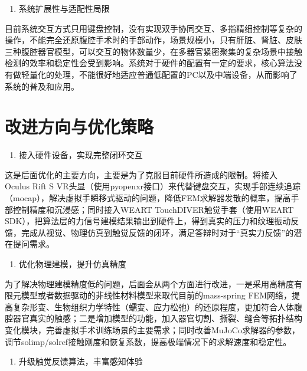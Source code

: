 \begin{enumerate}
\def\labelenumi{\arabic{enumi}.}
\setcounter{enumi}{3}
\item
  系统扩展性与适配性局限
\end{enumerate}

目前系统交互方式只用键盘控制，没有实现双手协同交互、多指精细控制等复杂的操作，不能完全还原腹腔手术时的手部动作，场景规模小，只有肝脏、肾脏、皮肤三种腹腔器官模型，可以交互的物体数量少，在多器官紧密聚集的复杂场景中接触检测的效率和稳定性会受到影响。系统对于硬件的配置有一定的要求，核心算法没有做轻量化的处理，不能很好地适应普通低配置的PC以及中端设备，从而影响了系统的普及和应用。

\section{改进方向与优化策略}

\begin{enumerate}
\def\labelenumi{\arabic{enumi}.}
\item
  接入硬件设备，实现完整闭环交互
\end{enumerate}

这是后面优化的主要方向，主要是为了克服目前硬件所造成的限制。将接入Oculus
Rift S
VR头显（使用pyopenxr接口）来代替键盘交互，实现手部连续追踪（mocap），解决虚拟手瞬移式驱动的问题，降低FEM求解器发散的概率，提高手部控制精度和沉浸感；同时接入WEART
TouchDIVER触觉手套（使用WEART
SDK），把算法层的力信号建模结果输出到硬件上，得到真实的压力和纹理振动反馈，完成从视觉、物理仿真到触觉反馈的闭环，满足答辩时对于``真实力反馈''的潜在提问需求。

\begin{enumerate}
\def\labelenumi{\arabic{enumi}.}
\setcounter{enumi}{1}
\item
  优化物理建模，提升仿真精度
\end{enumerate}

为了解决物理建模精度低的问题，后面会从两个方面进行改进，一是采用高精度有限元模型或者数据驱动的非线性材料模型来取代目前的mass-spring
FEM网络，提高复杂形变、生物组织力学特性（蠕变、应力松弛）的还原程度，更加符合人体腹腔器官真实的触感；二是增加模型的功能，加入器官切割、撕裂、缝合等拓扑结构变化模块，完善虚拟手术训练场景的主要需求；同时改善MuJoCo求解器的参数，调节solimp/solref接触刚度和恢复系数，提高极端情况下的求解速度和稳定性。

\begin{enumerate}
\def\labelenumi{\arabic{enumi}.}
\setcounter{enumi}{2}
\item
  升级触觉反馈算法，丰富感知体验
\end{enumerate}


